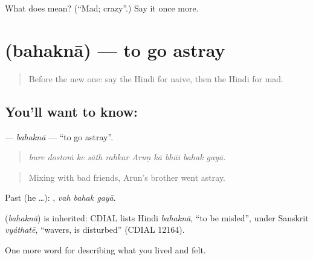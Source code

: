 \begin{tcolorbox}[breakable,colback=teal!4,colframe=teal!35!black,title={Before you move on}]
What does  mean? (\textquotedblleft{}Mad; crazy\textquotedblright{}.) Say it once more.
\end{tcolorbox}
\section[\texorpdfstring{\hi{बहकना} (bahaknā)}{बहकना (bahaknā)}]{ (bahaknā) — to go astray}

\label{lesson:HI-C474-bahakna}



\begin{quote}
Before the new one: say the Hindi for naive, then the Hindi for mad.
\end{quote}

\subsection*{You'll want to know: }
\textbf{} — \emph{bahaknā} — \textquotedblleft{}to go astray\textquotedblright{}.

\begin{quote}
         
\end{quote}

\begin{quote}
\emph{bure dostoṁ ke sāth rahkar Aruṇ kā bhāī bahak gayā.}
\end{quote}

\begin{quote}
Mixing with bad friends, Arun's brother went astray.
\end{quote}

Past (he …):   , \emph{vah bahak gayā}.

\begin{cousinweb}
\textbf{} (\emph{bahaknā}) is inherited: CDIAL lists Hindi \emph{bahaknā}, \textquotedblleft{}to be misled\textquotedblright{}, under Sanskrit \emph{vyáthatē}, \textquotedblleft{}wavers, is disturbed\textquotedblright{} (CDIAL 12164).
\end{cousinweb}

\begin{grammarlens}[title={What you've built}]
One more word for describing what you lived and felt.
\end{grammarlens}

